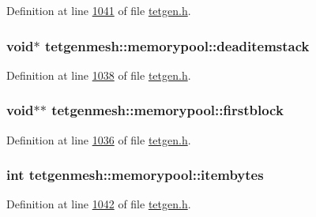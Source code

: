 Definition at line \hyperlink{tetgen_8h_source_l01041}{1041} of file \hyperlink{tetgen_8h_source}{tetgen.\+h}.

\subsubsection[{\texorpdfstring{deaditemstack}{deaditemstack}}]{\setlength{\rightskip}{0pt plus 5cm}void$\ast$ tetgenmesh\+::memorypool\+::deaditemstack}\hypertarget{classtetgenmesh_1_1memorypool_a5979100eaabf64ef2179a259e3adf0b7}{}\label{classtetgenmesh_1_1memorypool_a5979100eaabf64ef2179a259e3adf0b7}


Definition at line \hyperlink{tetgen_8h_source_l01038}{1038} of file \hyperlink{tetgen_8h_source}{tetgen.\+h}.

\subsubsection[{\texorpdfstring{firstblock}{firstblock}}]{\setlength{\rightskip}{0pt plus 5cm}void$\ast$$\ast$ tetgenmesh\+::memorypool\+::firstblock}\hypertarget{classtetgenmesh_1_1memorypool_a5a00ffcfb581ef96fb53c995b25838ee}{}\label{classtetgenmesh_1_1memorypool_a5a00ffcfb581ef96fb53c995b25838ee}


Definition at line \hyperlink{tetgen_8h_source_l01036}{1036} of file \hyperlink{tetgen_8h_source}{tetgen.\+h}.

\subsubsection[{\texorpdfstring{itembytes}{itembytes}}]{\setlength{\rightskip}{0pt plus 5cm}int tetgenmesh\+::memorypool\+::itembytes}\hypertarget{classtetgenmesh_1_1memorypool_adadcd6a22bbdd129b29e1a7a3cc4de43}{}\label{classtetgenmesh_1_1memorypool_adadcd6a22bbdd129b29e1a7a3cc4de43}


Definition at line \hyperlink{tetgen_8h_source_l01042}{1042} of file \hyperlink{tetgen_8h_source}{tetgen.\+h}.

